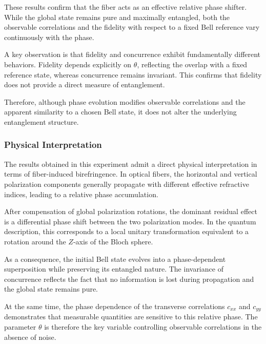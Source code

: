 \documentclass[a4paper]{article}
\begin{document}
These results confirm that the fiber acts as an effective relative phase shifter. While the global state remains pure and maximally entangled, both the observable correlations and the fidelity with respect to a fixed Bell reference vary continuously with the phase.

A key observation is that fidelity and concurrence exhibit fundamentally different behaviors. Fidelity depends explicitly on \( \theta \), reflecting the overlap with a fixed reference state, whereas concurrence remains invariant. This confirms that fidelity does not provide a direct measure of entanglement.

Therefore, although phase evolution modifies observable correlations and the apparent similarity to a chosen Bell state, it does not alter the underlying entanglement structure.


\subsubsection{Physical Interpretation}

The results obtained in this experiment admit a direct physical interpretation in terms of fiber-induced birefringence. In optical fibers, the horizontal and vertical polarization components generally propagate with different effective refractive indices, leading to a relative phase accumulation.

After compensation of global polarization rotations, the dominant residual effect is a differential phase shift between the two polarization modes. In the quantum description, this corresponds to a local unitary transformation equivalent to a rotation around the \(Z\)-axis of the Bloch sphere.

As a consequence, the initial Bell state evolves into a phase-dependent superposition while preserving its entangled nature. The invariance of concurrence reflects the fact that no information is lost during propagation and the global state remains pure.

At the same time, the phase dependence of the transverse correlations \(c_{xx}\) and \(c_{yy}\) demonstrates that measurable quantities are sensitive to this relative phase. The parameter \( \theta \) is therefore the key variable controlling observable correlations in the absence of noise.
\end{document}
